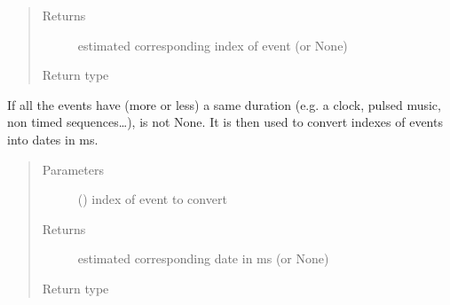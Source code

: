\documentclass[letterpaper,10pt,english]{sphinxmanual}
\begin{document}
\begin{fulllineitems}
\begin{fulllineitems}
\begin{quote}
\begin{description}
\item[{Returns}] \leavevmode
estimated corresponding index of event (or None)

\item[{Return type}] \leavevmode
{}

\end{description}\end{quote}

\end{fulllineitems}


\begin{fulllineitems}
\label{\detokenize{index:Generator.GenerationHandler.estimation_date_ms_of_event}}
If all the events have (more or less) a same duration (e.g. a clock, pulsed music, non timed sequences…), 
 is not None. It is then used to convert indexes of events into dates in ms.
\begin{quote}\begin{description}
\item[{Parameters}] \leavevmode
{} () \textendash{} index of event to convert

\item[{Returns}] \leavevmode
estimated corresponding date in ms (or None)

\item[{Return type}] \leavevmode
{}

\end{description}\end{quote}

\end{fulllineitems}


\begin{fulllineitems}
\label{\detokenize{index:Generator.GenerationHandler.inc_performance_time}}
\end{fulllineitems}


\end{fulllineitems}
\end{document}
